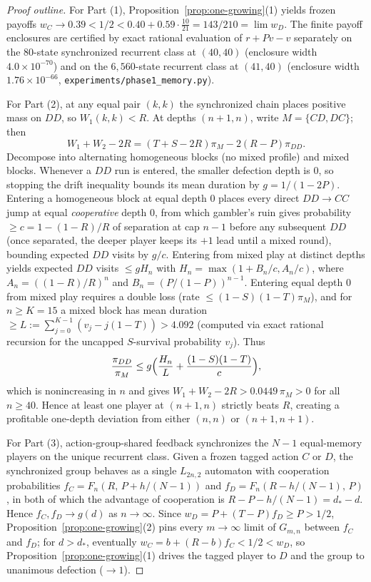 \documentclass[11pt,reqno]{amsart}
\theoremstyle{definition}
\theoremstyle{remark}
\begin{document}
\begin{proof}[Proof outline]
For Part (1), Proposition~\ref{prop:one-growing}(1) yields frozen payoffs $w_C \to 0.39 < 1/2 < 0.40 + 0.59\cdot\frac{10}{21} = 143/210 = \lim w_D$. The finite payoff enclosures are certified by exact rational evaluation of $r + P v - v$ separately on the $80$-state synchronized recurrent class at $(40,40)$ (enclosure width $4.0 \times 10^{-70}$) and on the $6{,}560$-state recurrent class at $(41,40)$ (enclosure width $1.76 \times 10^{-66}$, \texttt{experiments/phase1\_memory.py}).

For Part (2), at any equal pair $(k,k)$ the synchronized chain places positive mass on $DD$, so $W_1(k,k) < R$. At depths $(n+1, n)$, write $M = \{CD, DC\}$; then
\[
  W_1 + W_2 - 2R = (T + S - 2R)\pi_M - 2(R - P)\pi_{DD}.
\]
Decompose into alternating homogeneous blocks (no mixed profile) and mixed blocks. Whenever a $DD$ run is entered, the smaller defection depth is $0$, so stopping the drift inequality bounds its mean duration by $g = 1/(1-2P)$. Entering a homogeneous block at equal depth $0$ places every direct $DD\to CC$ jump at equal \emph{cooperative} depth $0$, from which gambler's ruin gives probability $\ge c = 1 - (1-R)/R$ of separation at cap $n-1$ before any subsequent $DD$ (once separated, the deeper player keeps its $+1$ lead until a mixed round), bounding expected $DD$ visits by $g/c$. Entering from mixed play at distinct depths yields expected $DD$ visits $\le g H_n$ with $H_n = \max(1+B_n/c, A_n/c)$, where $A_n = ((1-R)/R)^n$ and $B_n = (P/(1-P))^{n-1}$. Entering equal depth $0$ from mixed play requires a double loss (rate $\le (1-S)(1-T)\pi_M$), and for $n \ge K = 15$ a mixed block has mean duration $\ge L := \sum_{j=0}^{K-1}(v_j - j(1-T)) > 4.092$ (computed via exact rational recursion for the uncapped $S$-survival probability $v_j$). Thus
\[
  \frac{\pi_{DD}}{\pi_M} \le g\Bigl(\frac{H_n}{L} + \frac{(1-S)(1-T)}{c}\Bigr),
\]
which is nonincreasing in $n$ and gives $W_1 + W_2 - 2R > 0.0449\,\pi_M > 0$ for all $n \ge 40$. Hence at least one player at $(n+1,n)$ strictly beats $R$, creating a profitable one-depth deviation from either $(n,n)$ or $(n+1,n+1)$.

For Part (3), action-group-shared feedback synchronizes the $N-1$ equal-memory players on the unique recurrent class. Given a frozen tagged action $C$ or $D$, the synchronized group behaves as a single $L_{2n,2}$ automaton with cooperation probabilities $f_C = F_n(R,\, P + h/(N-1))$ and $f_D = F_n(R - h/(N-1),\, P)$, in both of which the advantage of cooperation is $R - P - h/(N-1) = d_* - d$. Hence $f_C, f_D \to g(d)$ as $n\to\infty$. Since $w_D = P + (T-P)f_D \ge P > 1/2$, Proposition~\ref{prop:one-growing}(2) pins every $m\to\infty$ limit of $G_{m,n}$ between $f_C$ and $f_D$; for $d > d_*$, eventually $w_C = b + (R-b)f_C < 1/2 < w_D$, so Proposition~\ref{prop:one-growing}(1) drives the tagged player to $D$ and the group to unanimous defection ($\to 1$).
\end{proof}
\end{document}

